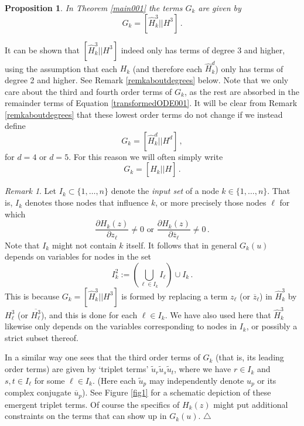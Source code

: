 \documentclass[12pt]{article}
\theoremstyle{plain}
\newtheorem{prop}[thr]{Proposition}
\theoremstyle{definition}
\theoremstyle{remark}
\newtheorem{remk}[thr]{Remark}
\theoremstyle{remark}
\begin{document}
\begin{prop}\label{newintterms}
In Theorem \ref{main001} the terms $G_k$ are given by
\begin{equation}
G_k = [\widehat{H}^3_{k}||{H}^3]\, .
\end{equation}
\end{prop}

It can be shown that $[\widehat{H}^3_{k}||{H}^3]$ indeed only has terms of degree $3$ and higher, using the assumption that each $H_{k}$ (and therefore each $\widehat{H}^d_{k}$) only has terms of degree 2 and higher. See Remark \ref{remkaboutdegrees} below. Note that we only care about the third and fourth order terms of $G_k$, as the rest are absorbed in the remainder terms of Equation \eqref{transformedODE001}. It will be clear from Remark \ref{remkaboutdegrees} that these lowest order terms do not change if we instead define
\begin{equation}
G_k = [\widehat{H}^d_{k}||{H}^d]\, ,
\end{equation}
for $d=4$ or $d=5$. For this reason we will often simply write
\begin{equation}
G_k = [\widehat{H}_{k}||{H}]\, . 
\end{equation}

\begin{remk}\label{I2}
Let $I_k \subset \{1, \dots, n\}$ denote the \emph{input set} of a node $k \in \{1, \dots, n\}$. That is, $I_k$ denotes those nodes that influence $k$, or more precisely those nodes $\ell$ for which $$\frac{\partial H_k(z)}{\partial z_{\ell}} \not= 0 \text{ or } \frac{\partial H_k(z)}{\partial \overline{z}_{\ell}} \not= 0 \, .$$ Note that $I_k$ might not contain $k$ itself. It follows that in general $G_k(u)$ depends on variables for nodes in the set
\begin{equation}
I^2_k := \left( \bigcup_{{\ell} \in I_k} I_{\ell}\right) \cup I_k\, . 
\end{equation}
This is because $G_k = [\widehat{H}^3_{k}||{H}^3]$ is formed by replacing a term $z_{\ell}$ (or $\overline{z}_{\ell}$) in $\widehat{H}^3_{k}$ by ${H}^3_{\ell}$ (or $\overline{{H}^3_{\ell}}$), and this is done for each $\ell \in I_k$. We have also used here that $\widehat{H}^3_{k}$ likewise only depends on the variables corresponding to nodes in $I_k$, or possibly a strict subset thereof. 

In a similar way one sees that the third order terms of $G_k$ (that is, its leading order terms) are given by `triplet terms' $\tilde{u}_r\tilde{u}_s\tilde{u}_t$, 
where we have $r \in I_k$ and $s,t \in I_{\ell}$ for some $\ell \in I_k$. (Here each $\tilde{u}_p$ may independently denote $u_p$ or its complex conjugate $\overline{u}_p$). See Figure \ref{fig1} for a schematic depiction of these emergent triplet terms.
Of course the specifics of $H_k(z)$ might put additional constraints on the terms that can show up in $G_k(u)$. \hfill $\triangle$
\end{remk}
\end{document}
